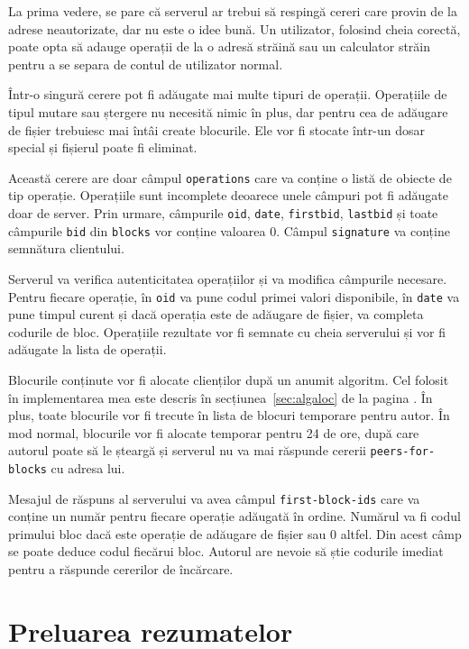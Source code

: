 \documentclass[a4wide,12pt]{report}
\newcommand{\cod}[1]{\texttt{#1}}
\begin{document}
La prima vedere, se pare că serverul ar trebui să respingă cereri care provin de la adrese neautorizate, dar nu este o
idee bună. Un utilizator, folosind cheia corectă, poate opta să adauge operații de la o adresă străină sau un calculator
străin pentru a se separa de contul de utilizator normal.

Într-o singură cerere pot fi adăugate mai multe tipuri de operații. Operațiile de tipul mutare sau ștergere nu necesită
nimic în plus, dar pentru cea de adăugare de fișier trebuiesc mai întâi create blocurile. Ele vor fi stocate într-un
dosar special și fișierul poate fi eliminat.

Această cerere are doar câmpul \cod{operations} care va conține o listă de obiecte de tip operație. Operațiile sunt
incomplete deoarece unele câmpuri pot fi adăugate doar de server. Prin urmare, câmpurile \cod{oid}, \cod{date},
\cod{firstbid}, \cod{lastbid} și toate câmpurile \cod{bid} din \cod{blocks} vor conține valoarea 0. Câmpul
\cod{signature} va conține semnătura clientului.

Serverul va verifica autenticitatea operațiilor și va modifica câmpurile necesare. Pentru fiecare operație, în \cod{oid}
va pune codul primei valori disponibile, în \cod{date} va pune timpul curent și dacă operația este de adăugare de
fișier, va completa codurile de bloc. Operațiile rezultate vor fi semnate cu cheia serverului și vor fi adăugate la
lista de operații.

Blocurile conținute vor fi alocate clienților după un anumit algoritm. Cel folosit în implementarea mea este descris în
secțiunea~\ref{sec:algaloc} de la pagina \pageref{sec:algaloc}. În plus, toate blocurile vor fi trecute în lista de
blocuri temporare pentru autor. În mod normal, blocurile vor fi alocate temporar pentru 24 de ore, după care autorul
poate să le șteargă și serverul nu va mai răspunde cererii \cod{peers-for-blocks} cu adresa lui.

Mesajul de răspuns al serverului va avea câmpul \cod{first-block-ids} care va conține un număr pentru fiecare operație
adăugată în ordine. Numărul va fi codul primului bloc dacă este operație de adăugare de fișier sau 0 altfel. Din acest
câmp se poate deduce codul fiecărui bloc. Autorul are nevoie să știe codurile imediat pentru a răspunde cererilor de
încărcare.

\section{Preluarea rezumatelor} %
\end{document}
